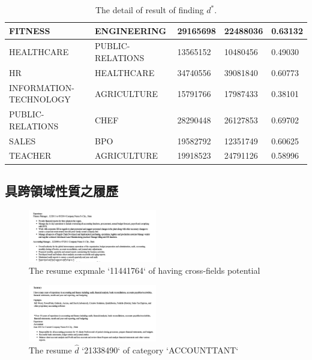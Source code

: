 \documentclass[sigconf]{acmart}
\begin{document}
\begin{table}[t]
{\begin{tabular}{|l|l|l|l|l|}
FITNESS                & ENGINEERING            & 29165698   & 22488036    & 0.63132 \\ \hline
HEALTHCARE             & PUBLIC-RELATIONS       & 13565152   & 10480456    & 0.49030 \\ \hline
HR                     & HEALTHCARE             & 34740556   & 39081840    & 0.60773 \\ \hline
INFORMATION-TECHNOLOGY & AGRICULTURE            & 15791766   & 17987433    & 0.38101 \\ \hline
PUBLIC-RELATIONS       & CHEF                   & 28290448   & 26127853    & 0.69702 \\ \hline
SALES                  & BPO                    & 19582792   & 12351749    & 0.60625 \\ \hline
TEACHER                & AGRICULTURE            & 19918523   & 24791126    & 0.58996 \\ \hline
\end{tabular}%
}
\caption{The detail of result of finding $d^{*}$.}
\label{table:1}
\end{table}


\subsection{具跨領域性質之履歷}

\begin{figure}[t]
    \centerline{\includegraphics[width=0.5\textwidth]{cross_fields.png}}
    \caption{The resume expmale `11441764` of having cross-fields potential}
    \label{cross_fields}
\end{figure}

\begin{figure}[t]
    \centerline{\includegraphics[width=0.5\textwidth]{resume_d_hat.png}}
    \caption{The resume $\hat{d}$ `21338490` of category `ACCOUNTTANT`}
    \label{resume_d_hat}
\end{figure}
\end{document}

